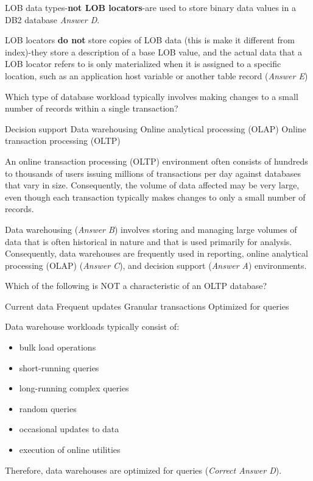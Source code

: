 \documentclass[answers, 11pt]{exam}
\begin{document}
\begin{questions}
\begin{solution}
LOB data types-\textbf{not LOB locators}-are used to store binary data values in a DB2 database
\textit{Answer D}.
\par

LOB locators \textbf{do not} store copies of LOB data (this is make it different from index)-they
store a description of a base LOB value, and the actual data that a LOB locator refers to is only
materialized when it is assigned to a specific location, such as an application host variable or
another table record (\textit{Answer E})


\end{solution}

\question[1]
Which type of database workload typically involves making changes to a small number of records within
a single transaction?
\begin{choices}
\choice Decision support
\choice Data warehousing
\choice Online analytical processing (OLAP)
\CorrectChoice Online transaction processing (OLTP)
\end{choices}

\begin{solution}
An online transaction processing (OLTP) environment often consists of hundreds to thousands of
users issuing millions of transactions per day against databases that vary in size.
Consequently, the volume of data affected may be very large, even though {\color{red} each transaction
typically makes changes to only a small number of records}.
\par

Data warehousing (\textit{Answer B}) involves storing and managing large volumes of data that is often 
historical in nature and that is used primarily for analysis. Consequently, data warehouses are frequently
used in reporting, online analytical processing (OLAP) (\textit{Answer C}), and decision support 
(\textit{Answer A}) environments.


\end{solution}


\question[1]
Which of the following is NOT a characteristic of an OLTP database?
\begin{choices}
\choice Current data
\choice Frequent updates
\choice Granular transactions
\CorrectChoice Optimized for queries
\end{choices}

\begin{solution}
Data warehouse workloads typically consist of:
\begin{itemize}
\item bulk load operations
\item short-running queries
\item long-running complex queries
\item random queries
\item occasional updates to data
\item execution of online utilities
\end{itemize}
Therefore, data warehouses are optimized for queries (\textit{Correct Answer D}).
\par


\end{solution}
\end{questions}
\end{document}
